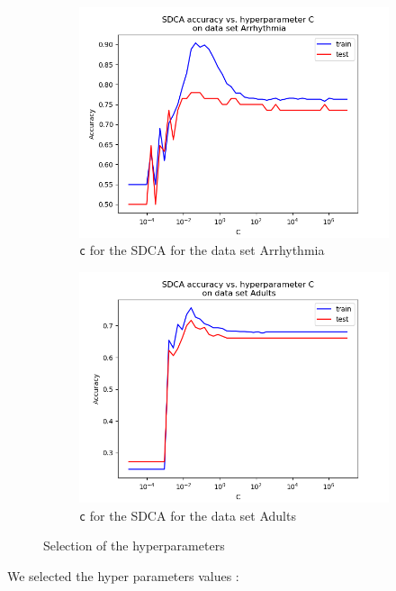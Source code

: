 \documentclass{article}
\begin{document}
\begin{figure}[H]
	\begin{subfigure}[t]{0.45\linewidth}
		\includegraphics[width=\linewidth]{figs/hyperparams/arrhythmia_sdca_c.png}
		\caption{\texttt{c} for the SDCA for the data set Arrhythmia}
	\end{subfigure}
	\begin{subfigure}[t]{0.45\linewidth}
		\includegraphics[width=\linewidth]{figs/hyperparams/adults_sdca_c.png}
		\caption{\texttt{c} for the SDCA for the data set Adults}
	\end{subfigure}
	\caption{Selection of the hyperparameters}
\end{figure}

We selected the hyper parameters values :
\end{document}
